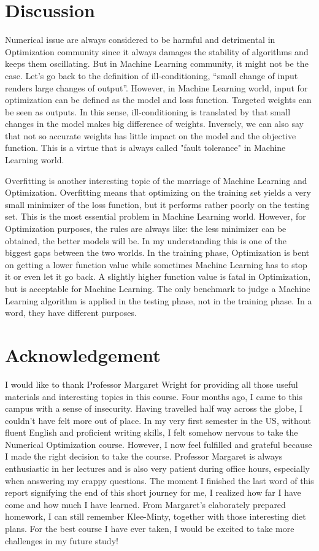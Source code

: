 \documentclass{article} %
\begin{document}
\section{Discussion}
Numerical issue are always considered to be harmful and detrimental in Optimization community since it always damages the stability of algorithms and keeps them oscillating. But in Machine Learning community, it might not be the case. Let's go back to the definition of ill-conditioning, “small change of input renders large changes of output”. However, in Machine Learning world, input for optimization can be defined as the model and loss function. Targeted weights can be seen as outputs. In this sense, ill-conditioning is translated by that small changes in the model makes big difference of weights. Inversely, we can also say that not so accurate weights has little impact on the model and the objective function. This is a virtue that is always called "fault tolerance" in Machine Learning world.

Overfitting is another interesting topic of the marriage of Machine Learning and Optimization. Overfitting means that optimizing on the training set yields a very small minimizer of the loss function, but it performs rather poorly on the testing set. This is the most essential problem in Machine Learning world. However, for Optimization purposes, the rules are always like: the less minimizer can be obtained, the better models will be. In my understanding this is one of the biggest gaps between the two worlds. In the training phase, Optimization is bent on getting a lower function value while sometimes Machine Learning has to stop it or even let it go back. A slightly higher function value is fatal in Optimization, but is acceptable for Machine Learning. The only benchmark to judge a Machine Learning algorithm is applied in the testing phase, not in the training phase. In a word, they have different purposes.

\newpage
\section*{Acknowledgement}
I would like to thank Professor Margaret Wright for providing all those useful materials and interesting topics in this course. Four months ago, I came to this campus with a sense of insecurity. Having travelled half way across the globe, I couldn't have felt more out of place. In my very first semester in the US, without fluent English and proficient writing skills, I felt somehow nervous to take the Numerical Optimization course. However, I now feel fulfilled and grateful because I made the right decision to take the course. Professor Margaret is always enthusiastic in her lectures and is also very patient during office hours, especially when answering my crappy questions. The moment I finished the last word of this report signifying the end of this short journey for me, I realized how far I have come and how much I have learned. From Margaret's elaborately prepared homework, I can still remember Klee-Minty, together with those interesting diet plans. For the best course I have ever taken, I would be excited to take more challenges in my future study!
\end{document}
